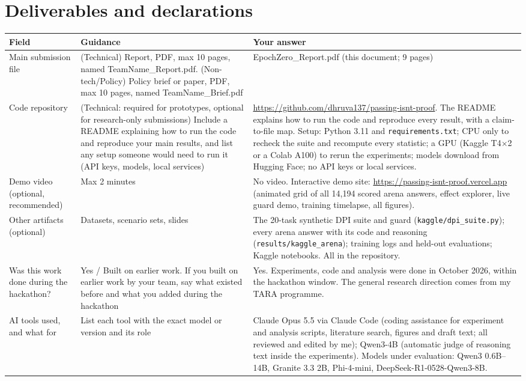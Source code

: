 \documentclass[11pt]{article}
\begin{document}
\FloatBarrier
\section{Deliverables and declarations}
{\small\noindent\begin{xltabular}{\textwidth}{@{}L{0.15\textwidth} L{0.28\textwidth} Y@{}}
\toprule
\textbf{Field} & \textbf{Guidance} & \textbf{Your answer} \\
\midrule
\endhead
Main submission file & (Technical) Report, PDF, max 10 pages, named TeamName\_Report.pdf. (Non-tech/Policy) Policy brief or paper, PDF, max 10 pages, named TeamName\_Brief.pdf & EpochZero\_Report.pdf (this document; 9 pages) \\
Code repository & (Technical: required for prototypes, optional for research-only submissions) Include a README explaining how to run the code and reproduce your main results, and list any setup someone would need to run it (API keys, models, local services) & \url{https://github.com/dhruva137/passing-isnt-proof}. The README explains how to run the code and reproduce every result, with a claim-to-file map. Setup: Python 3.11 and \texttt{requirements.txt}; CPU only to recheck the suite and recompute every statistic; a GPU (Kaggle T4$\times$2 or a Colab A100) to rerun the experiments; models download from Hugging Face; no API keys or local services. \\
Demo video (optional, recommended) & Max 2 minutes & No video. Interactive demo site: \url{https://passing-isnt-proof.vercel.app} (animated grid of all 14,194 scored arena answers, effect explorer, live guard demo, training timelapse, all figures). \\
Other artifacts (optional) & Datasets, scenario sets, slides & The 20-task synthetic DPI suite and guard (\texttt{kaggle/dpi\_suite.py}); every arena answer with its code and reasoning (\texttt{results/kaggle\_arena}); training logs and held-out evaluations; Kaggle notebooks. All in the repository. \\
Was this work done during the hackathon? & Yes / Built on earlier work. If you built on earlier work by your team, say what existed before and what you added during the hackathon & Yes. Experiments, code and analysis were done in October 2026, within the hackathon window. The general research direction comes from my TARA programme. \\
AI tools used, and what for & List each tool with the exact model or version and its role & Claude Opus 5.5 via Claude Code (coding assistance for experiment and analysis scripts, literature search, figures and draft text; all reviewed and edited by me); Qwen3-4B (automatic judge of reasoning text inside the experiments). Models under evaluation: Qwen3 0.6B--14B, Granite 3.3 2B, Phi-4-mini, DeepSeek-R1-0528-Qwen3-8B. \\

\end{xltabular}}
\end{document}
